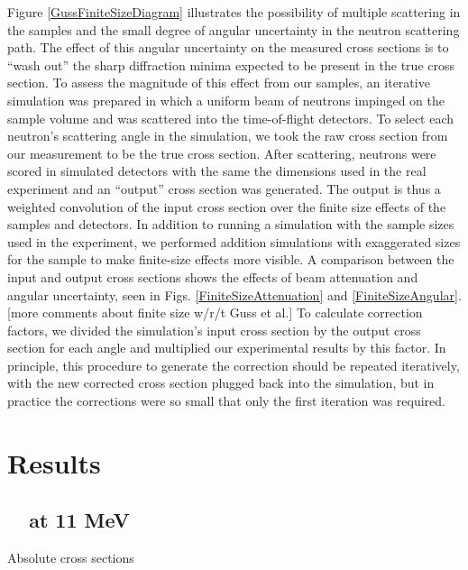 Figure \ref{GussFiniteSizeDiagram} illustrates the possibility of multiple scattering in the samples
and the small degree of angular uncertainty in the neutron scattering path.
The effect of this angular uncertainty on the measured cross
sections is to ``wash out'' the sharp diffraction minima expected to be present in the true cross
section. To assess the magnitude of this effect from our
samples, an iterative simulation was prepared in which a uniform beam of neutrons
impinged on the sample volume and was scattered into the time-of-flight
detectors. To select each neutron's scattering angle in the simulation, we took the
raw cross section from our measurement to be the true cross section. After
scattering, neutrons were scored in simulated detectors with the same the dimensions
used in the real experiment and an ``output'' cross section was generated. The
output is thus a weighted convolution of the input cross section
over the finite size effects of the samples and detectors. In addition to
running a simulation with the sample sizes used in the experiment, we performed
addition simulations with exaggerated sizes for the
sample to make finite-size effects more visible. A comparison between the input
and output cross sections shows the effects of beam attenuation and angular
uncertainty, seen in Figs. \ref{FiniteSizeAttenuation} and \ref{FiniteSizeAngular}.
[more comments about finite size w/r/t Guss et al.]
To calculate correction factors, we divided the simulation's
input cross section by the output cross section for each angle and multiplied our
experimental results by this factor. In principle, this procedure to generate
the correction should be repeated iteratively, with the new corrected cross
section plugged back into the simulation, but in practice the corrections were so small
that only the first iteration was required.

\section{Results}
\subsection{\snTwelveFour\ \el\ at 11 MeV}
Absolute cross sections 


